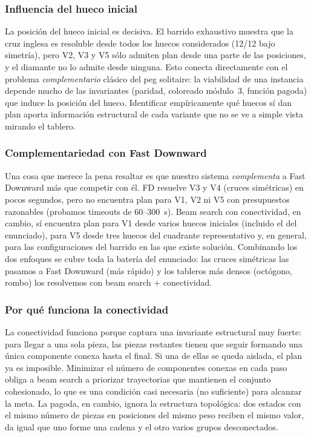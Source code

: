 \documentclass[conference,a4paper]{IEEEtran}
\begin{document}
\subsubsection{Influencia del hueco inicial}

La posición del hueco inicial es decisiva. El barrido exhaustivo
muestra que la cruz inglesa es resoluble desde todos los huecos
considerados (12/12 bajo simetría), pero V2, V3 y V5 sólo admiten plan
desde una parte de las posiciones, y el diamante no lo admite desde
ninguna. Esto conecta directamente con el problema
\emph{complementario} clásico del peg solitaire: la viabilidad de una
instancia depende mucho de las invariantes (paridad, coloreado
módulo~3, función pagoda) que induce la posición del hueco. Identificar
empíricamente qué huecos sí dan plan aporta información estructural de
cada variante que no se ve a simple vista mirando el tablero.

\subsubsection{Complementariedad con Fast Downward}

Una cosa que merece la pena resaltar es que nuestro sistema
\emph{complementa} a Fast Downward más que competir con él. FD resuelve
V3 y V4 (cruces simétricas) en pocos segundos, pero no encuentra plan
para V1, V2 ni V5 con presupuestos razonables (probamos timeouts de
60--300~s). Beam search con conectividad, en cambio, sí encuentra plan
para V1 desde varios huecos iniciales (incluido el del enunciado),
para V5 desde tres huecos del cuadrante representativo y, en general,
para las configuraciones del barrido en las que existe solución.
Combinando los dos enfoques se cubre toda la batería del enunciado: las
cruces simétricas las pasamos a Fast Downward (más rápido) y los
tableros más densos (octógono, rombo) los resolvemos con beam search +
conectividad.

\subsubsection{Por qué funciona la conectividad}

La conectividad funciona porque captura una invariante estructural muy
fuerte: para llegar a una sola pieza, las piezas restantes tienen que
seguir formando una única componente conexa hasta el final. Si una de
ellas se queda aislada, el plan ya es imposible. Minimizar el número de
componentes conexas en cada paso obliga a beam search a priorizar
trayectorias que mantienen el conjunto cohesionado, lo que es una
condición casi necesaria (no suficiente) para alcanzar la meta. La
pagoda, en cambio, ignora la estructura topológica: dos estados con el
mismo número de piezas en posiciones del mismo peso reciben el mismo
valor, da igual que uno forme una cadena y el otro varios grupos
desconectados.
\end{document}

